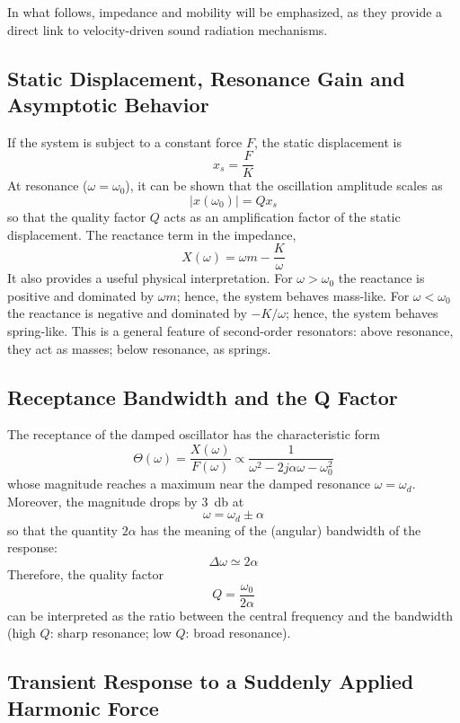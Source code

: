 In what follows, impedance and mobility will be emphasized, as they provide a direct link to velocity-driven sound radiation mechanisms. 

\subsection{Static Displacement, Resonance Gain and Asymptotic Behavior}

If the system is subject to a constant force \( F \), the static displacement is
\[
x_s = \frac{F}{K}
\]
At resonance (\( \omega = \omega_0 \)), it can be shown that the oscillation amplitude scales as
\[
|x(\omega_0)| = Qx_s
\]
so that the quality factor \( Q \) acts as an amplification factor of the static displacement. The reactance term in the impedance,
\[
X(\omega) = \omega m - \frac{K}{\omega}
\]
It also provides a useful physical interpretation. For \( \omega > \omega_0 \) the reactance is positive and dominated by \( \omega m \); hence, the system behaves mass-like. For \( \omega < \omega_0 \) the reactance is negative and dominated by \( - K/\omega \); hence, the system behaves spring-like. This is a general feature of second-order resonators: above resonance, they act as masses; below resonance, as springs.

\subsection{Receptance Bandwidth and the Q Factor}

The receptance of the damped oscillator has the characteristic form
\[
\Theta(\omega) = \frac{X(\omega)}{F(\omega)}
\propto
\frac{1}{\omega^{2} - 2j\alpha\omega - \omega_0^{2}}
\]
whose magnitude reaches a maximum near the damped resonance \( \omega = \omega_d \). Moreover, the magnitude drops by \SI{3}{\decibel} at
\[
\omega = \omega_d \pm \alpha
\]
so that the quantity \( 2 \alpha \) has the meaning of the (angular) bandwidth of the response:
\[
\Delta\omega \simeq 2\alpha
\]
Therefore, the quality factor
\[
Q = \frac{\omega_0}{2\alpha}
\]
can be interpreted as the ratio between the central frequency and the bandwidth (high \( Q \): sharp resonance; low \( Q \): broad resonance).

\subsection{Transient Response to a Suddenly Applied Harmonic Force}

